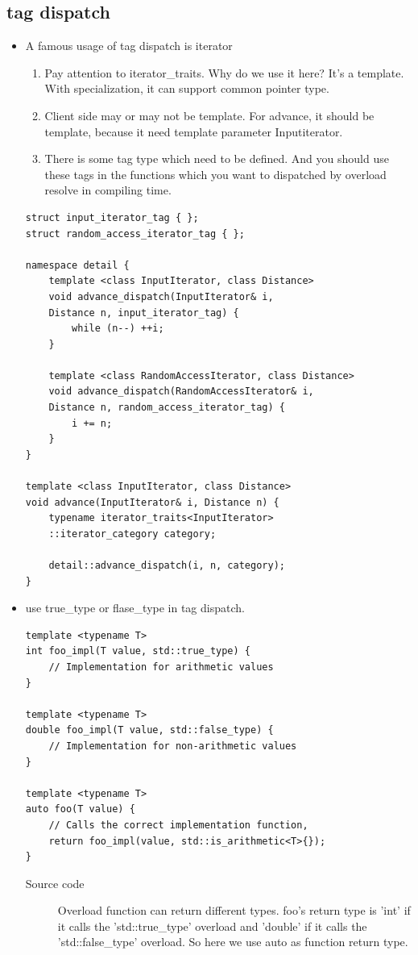 \documentclass[a4paper,11pt,twoside]{book}
\begin{document}
\subsection{tag dispatch}
\begin{itemize}
	\item A famous usage of tag dispatch is iterator 
	\begin{enumerate}
		\item Pay attention to iterator\_traits. Why do we use it here? It's a template. With specialization, it can support common pointer type.
		
		\item Client side may or may not be template. For advance, it should be template, because it need template parameter Inputiterator.
		
		\item There is some tag type which need to be defined. And you should use these tags in the functions which you want to dispatched by overload resolve in compiling time. 
	\end{enumerate}
\begin{lstlisting}[numbers=none]
struct input_iterator_tag { };
struct random_access_iterator_tag { };

namespace detail {
	template <class InputIterator, class Distance>
	void advance_dispatch(InputIterator& i, 
	Distance n, input_iterator_tag) {
		while (n--) ++i;
	}
	
	template <class RandomAccessIterator, class Distance>
	void advance_dispatch(RandomAccessIterator& i,
	Distance n, random_access_iterator_tag) {
		i += n;
	}
}

template <class InputIterator, class Distance>
void advance(InputIterator& i, Distance n) {
	typename iterator_traits<InputIterator>
	::iterator_category category;
	
	detail::advance_dispatch(i, n, category);
}	
\end{lstlisting}	

    \item use true\_type or flase\_type in tag dispatch.
\begin{lstlisting}[numbers=none]
template <typename T>
int foo_impl(T value, std::true_type) {
	// Implementation for arithmetic values
}

template <typename T>
double foo_impl(T value, std::false_type) {
	// Implementation for non-arithmetic values
}

template <typename T>
auto foo(T value) {
	// Calls the correct implementation function, 
	return foo_impl(value, std::is_arithmetic<T>{});
}
\end{lstlisting}
\begin{description}
	\item[Source code] Overload function can return different types. foo's return type is 'int' if it calls the 'std::true\_type' overload and 'double' if it calls the 'std::false\_type' overload. So here we use auto as function return type.
\end{description}


\end{itemize}
\end{document}
